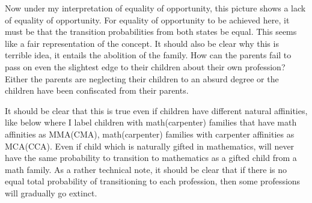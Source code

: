 \documentclass{report}
\begin{document}
Now under my interpretation of equality of opportunity, this picture shows a lack of equality of opportunity. For equality of opportunity to be achieved here, it must be that the transition probabilities from both states be equal. This seems like a fair representation of the concept. It should also be clear why this is terrible idea, it entails the abolition of the family. How can the parents fail to pass on even the slightest edge to their children about their own profession? Either the parents are neglecting their children to an absurd degree or the children have been confiscated from their parents. 

It should be clear that this is true even if children have different natural affinities, like below where I label children with math(carpenter) families that have math affinities as MMA(CMA), math(carpenter) families with carpenter affinities as MCA(CCA). Even if child which is naturally gifted in mathematics, will never have the same probability to transition to mathematics as a gifted child from a math family. As a rather technical note, it should be clear that if there is no equal total probability of transitioning to each profession, then some professions will gradually go extinct. 

\end{document}

